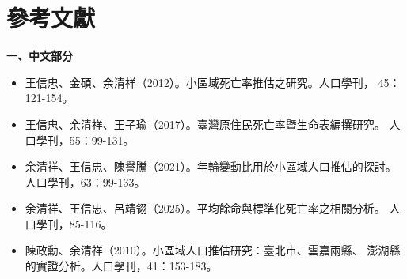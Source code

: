 \documentclass[UTF8, fontset=macnew, a4paper, 12pt]{ctexart}
\begin{document}
\section*{參考文獻}

\noindent\textbf{一、中文部分}
\begin{itemize}[leftmargin=2em, label={}, itemsep=3pt]
  \item[] 王信忠、金碩、余清祥（2012）。小區域死亡率推估之研究。人口學刊，
        45：121-154。
  \item[] 王信忠、余清祥、王子瑜（2017）。臺灣原住民死亡率暨生命表編撰研究。
        人口學刊，55：99-131。
  \item[] 余清祥、王信忠、陳譽騰（2021）。年輪變動比用於小區域人口推估的探討。
        人口學刊，63：99-133。
  \item[] 余清祥、王信忠、呂靖翎（2025）。平均餘命與標準化死亡率之相關分析。
        人口學刊，85-116。
  \item[] 陳政勳、余清祥（2010）。小區域人口推估研究：臺北市、雲嘉兩縣、
        澎湖縣的實證分析。人口學刊，41：153-183。
\end{itemize}

\renewcommand{\bibsection}{\vspace{8pt}\noindent\textbf{二、英文部分}\par\vspace{4pt}}
\setlength{\bibsep}{2pt}


\end{document}
